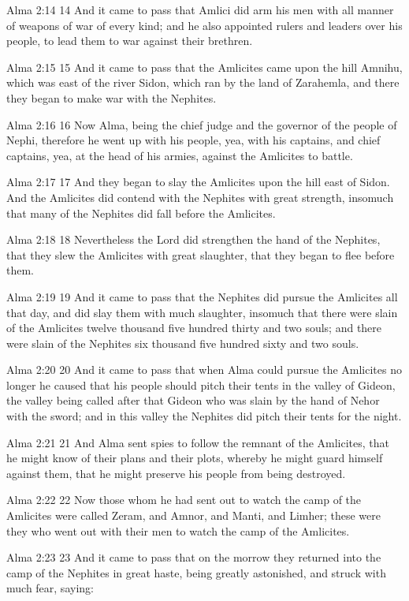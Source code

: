 Alma 2:14
 14 And it came to pass that Amlici did arm his men with all
manner of weapons of war of every kind; and he also appointed
rulers and leaders over his people, to lead them to war against
their brethren.

Alma 2:15
 15 And it came to pass that the Amlicites came upon the hill
Amnihu, which was east of the river Sidon, which ran by the land
of Zarahemla, and there they began to make war with the Nephites.

Alma 2:16
 16 Now Alma, being the chief judge and the governor of the
people of Nephi, therefore he went up with his people, yea, with
his captains, and chief captains, yea, at the head of his armies,
against the Amlicites to battle.

Alma 2:17
 17 And they began to slay the Amlicites upon the hill east of
Sidon. And the Amlicites did contend with the Nephites with
great strength, insomuch that many of the Nephites did fall
before the Amlicites.

Alma 2:18
 18 Nevertheless the Lord did strengthen the hand of the
Nephites, that they slew the Amlicites with great slaughter, that
they began to flee before them.

Alma 2:19
 19 And it came to pass that the Nephites did pursue the
Amlicites all that day, and did slay them with much slaughter,
insomuch that there were slain of the Amlicites twelve thousand
five hundred thirty and two souls; and there were slain of the
Nephites six thousand five hundred sixty and two souls.

Alma 2:20
 20 And it came to pass that when Alma could pursue the Amlicites
no longer he caused that his people should pitch their tents in
the valley of Gideon, the valley being called after that Gideon
who was slain by the hand of Nehor with the sword; and in this
valley the Nephites did pitch their tents for the night.

Alma 2:21
 21 And Alma sent spies to follow the remnant of the Amlicites,
that he might know of their plans and their plots, whereby he
might guard himself against them, that he might preserve his
people from being destroyed.

Alma 2:22
 22 Now those whom he had sent out to watch the camp of the
Amlicites were called Zeram, and Amnor, and Manti, and Limher;
these were they who went out with their men to watch the camp of
the Amlicites.

Alma 2:23
 23 And it came to pass that on the morrow they returned into the
camp of the Nephites in great haste, being greatly astonished,
and struck with much fear, saying:

